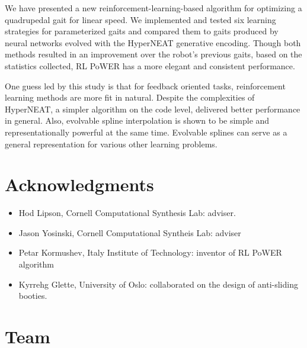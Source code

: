 We have presented a new reinforcement-learning-based algorithm for
optimizing a quadrupedal gait for linear speed. We implemented and
tested six learning strategies for parameterized gaits and compared
them to gaits produced by neural networks evolved with the HyperNEAT
generative encoding. Though both methods resulted in an improvement
over the robot’s previous \naive gaits, based on the statistics
collected, RL PoWER has a more elegant and consistent performance.


One guess led by this study is that for feedback oriented tasks,
reinforcement learning methods are more fit in natural. Despite the
complexities of HyperNEAT, a simpler algorithm on the code level,
delivered better performance in general. Also, evolvable spline
interpolation is shown to be simple and representationally powerful at
the same time. Evolvable splines can serve as a general representation for various other
learning problems.


\section{Acknowledgments}
\begin{itemize}
\item Hod Lipson, Cornell Computational Synthesis Lab: adviser.
\item Jason Yosinski, Cornell Computational Syntheis Lab: adviser
\item Petar Kormushev, Italy Institute of Technology: inventor of RL PoWER algorithm
\item Kyrrehg Glette, University of Oslo: collaborated on the design of anti-sliding booties.
\end{itemize}

\section{Team}

